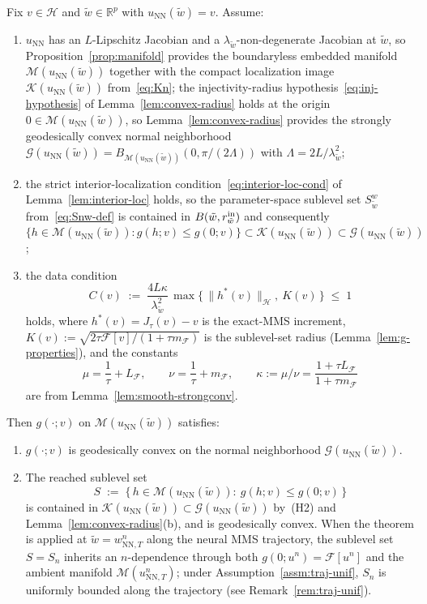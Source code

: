 \documentclass[twoside,11pt]{article}
\newcommand{\R}{\mathbb{R}}
\newcommand{\NN}{\mathrm{NN}}
\newcommand{\calF}{\mathcal{F}}
\newcommand{\calG}{\mathcal{G}}
\newcommand{\calH}{\mathcal{H}}
\newcommand{\calK}{\mathcal{K}}
\newcommand{\calM}{\mathcal{M}}
\begin{document}
\begin{theorem}\label{thm:g}
Fix $v\in\calH$ and $\tilde w\in\R^p$ with $u_\NN(\tilde w)=v$. Assume:
\begin{enumerate}[label=\textnormal{(H\arabic*)},leftmargin=*,nosep]
    \item $u_\NN$ has an $L$-Lipschitz Jacobian and a $\lambda_{\tilde w}$-non-degenerate Jacobian at $\tilde w$, so Proposition~\ref{prop:manifold} provides the boundaryless embedded manifold $\calM(u_\NN(\tilde w))$ together with the compact localization image $\calK(u_\NN(\tilde w))$ from~\eqref{eq:Kn}; the injectivity-radius hypothesis~\eqref{eq:inj-hypothesis} of Lemma~\ref{lem:convex-radius} holds at the origin $0\in\calM(u_\NN(\tilde w))$, so Lemma~\ref{lem:convex-radius} provides the strongly geodesically convex normal neighborhood $\calG(u_\NN(\tilde w)) = B_{\calM(u_\NN(\tilde w))}(0,\pi/(2\Lambda))$ with $\Lambda = 2L/\lambda_{\tilde w}^2$;
    \item the strict interior-localization condition~\eqref{eq:interior-loc-cond} of Lemma~\ref{lem:interior-loc} holds, so the parameter-space sublevel set $S^w_{\tilde w}$ from~\eqref{eq:Snw-def} is contained in $B(\tilde w, r^{\rm in}_{\tilde w})$ and consequently $\{h \in \calM(u_\NN(\tilde w)) : g(h;v) \le g(0;v)\} \subset \calK(u_\NN(\tilde w)) \subset \calG(u_\NN(\tilde w))$;
    \item the data condition
    \begin{equation}\label{eq:data-condition}
        C(v) \;:=\; \frac{4L\kappa}{\lambda_{\tilde w}^{2}}\,\max\!\bigl\{\,\|h^*(v)\|_\calH,\ K(v)\,\bigr\}\;\le\;1
    \end{equation}
    holds, where $h^*(v) = J_\tau(v) - v$ is the exact-MMS increment, $K(v) := \sqrt{2\tau\calF[v]/(1+\tau m_\calF)}$ is the sublevel-set radius (Lemma~\ref{lem:g-properties}), and the constants
    \[
    \mu=\frac{1}{\tau}+L_\calF,\qquad
    \nu=\frac{1}{\tau}+m_\calF,\qquad
    \kappa:=\mu/\nu=\frac{1+\tau L_\calF}{1+\tau m_\calF}
    \]
    are from Lemma~\ref{lem:smooth-strongconv}.
\end{enumerate}
Then $g(\cdot;v)$ on $\calM(u_\NN(\tilde w))$ satisfies:
\begin{enumerate}
    \item[(a).] $g(\cdot;v)$ is geodesically convex on the normal neighborhood $\calG(u_\NN(\tilde w))$.

    \item[(b).] The reached sublevel set
    \begin{equation}\label{eq:sublevel-S}
        S \;:=\; \bigl\{\,h\in\calM(u_\NN(\tilde w)):\ g(h;v)\le g(0;v)\,\bigr\}
    \end{equation}
    is contained in $\calK(u_\NN(\tilde w)) \subset \calG(u_\NN(\tilde w))$ by~(H2) and Lemma~\ref{lem:convex-radius}(b), and is geodesically convex. When the theorem is applied at $\tilde w=w^n_{\NN,T}$ along the neural MMS trajectory, the sublevel set $S=S_n$ inherits an $n$-dependence through both $g(0;u^n)=\calF[u^n]$ and the ambient manifold $\calM(u^n_{\NN,T})$; under Assumption~\ref{assm:traj-unif}, $S_n$ is uniformly bounded along the trajectory (see Remark~\ref{rem:traj-unif}).


\end{enumerate}
\end{theorem}
\end{document}
